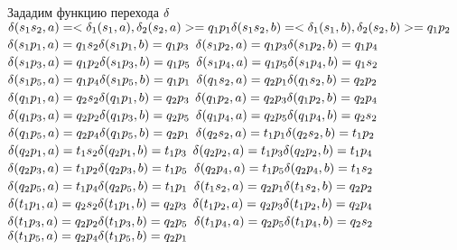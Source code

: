 \documentclass[a4paper, 12pt]{article}
\begin{document}
Зададим функцию перехода $\delta\\$
\nointend
$\delta(s_1s_2, a) = <\delta_1(s_1, a), \delta_2(s_2, a)> = q_1p_1 \hfill \delta(s_1s_2, b) = <\delta_1(s_1, b), \delta_2(s_2, b)> = q_1p_2\\$
$\delta(s_1p_1, a) = q_1s_2 \hfill \delta(s_1p_1, b) = q_1p_3\\$
$\delta(s_1p_2, a) = q_1p_3 \hfill \delta(s_1p_2, b) = q_1p_4\\$
$\delta(s_1p_3, a) = q_1p_2 \hfill \delta(s_1p_3, b) = q_1p_5\\$
$\delta(s_1p_4, a) = q_1p_5 \hfill \delta(s_1p_4, b) = q_1s_2\\$
$\delta(s_1p_5, a) = q_1p_4 \hfill \delta(s_1p_5, b) = q_1p_1\\$
$\delta(q_1s_2, a) = q_2p_1 \hfill \delta(q_1s_2, b) = q_2p_2\\$
$\delta(q_1p_1, a) = q_2s_2 \hfill \delta(q_1p_1, b) = q_2p_3\\$
$\delta(q_1p_2, a) = q_2p_3 \hfill \delta(q_1p_2, b) = q_2p_4\\$
$\delta(q_1p_3, a) = q_2p_2 \hfill \delta(q_1p_3, b) = q_2p_5\\$
$\delta(q_1p_4, a) = q_2p_5 \hfill \delta(q_1p_4, b) = q_2s_2\\$
$\delta(q_1p_5, a) = q_2p_4 \hfill \delta(q_1p_5, b) = q_2p_1\\$
$\delta(q_2s_2, a) = t_1p_1 \hfill \delta(q_2s_2, b) = t_1p_2\\$
$\delta(q_2p_1, a) = t_1s_2 \hfill \delta(q_2p_1, b) = t_1p_3\\$
$\delta(q_2p_2, a) = t_1p_3 \hfill \delta(q_2p_2, b) = t_1p_4\\$
$\delta(q_2p_3, a) = t_1p_2 \hfill \delta(q_2p_3, b) = t_1p_5\\$
$\delta(q_2p_4, a) = t_1p_5 \hfill \delta(q_2p_4, b) = t_1s_2\\$
$\delta(q_2p_5, a) = t_1p_4 \hfill \delta(q_2p_5, b) = t_1p_1\\$
$\delta(t_1s_2, a) = q_2p_1 \hfill \delta(t_1s_2, b) = q_2p_2\\$
$\delta(t_1p_1, a) = q_2s_2 \hfill \delta(t_1p_1, b) = q_2p_3\\$
$\delta(t_1p_2, a) = q_2p_3 \hfill \delta(t_1p_2, b) = q_2p_4\\$
$\delta(t_1p_3, a) = q_2p_2 \hfill \delta(t_1p_3, b) = q_2p_5\\$
$\delta(t_1p_4, a) = q_2p_5 \hfill \delta(t_1p_4, b) = q_2s_2\\$
$\delta(t_1p_5, a) = q_2p_4 \hfill \delta(t_1p_5, b) = q_2p_1\\$
\end{document}

